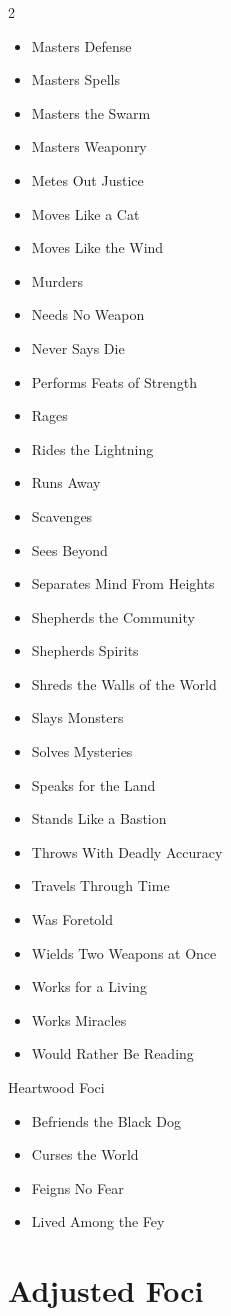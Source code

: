 \begin{multicols}{2}
\begin{itemize}
\item Masters Defense
\item Masters Spells
\item Masters the Swarm
\item Masters Weaponry
\item Metes Out Justice
\item Moves Like a Cat 
\item Moves Like the Wind 
\item Murders
\item Needs No Weapon
\item Never Says Die
\item Performs Feats of Strength
\item Rages
\item Rides the Lightning
\item Runs Away
\item Scavenges
\item Sees Beyond
\item Separates Mind From Heights
\item Shepherds the Community
\item Shepherds Spirits
\item Shreds the Walls of the World
\item Slays Monsters
\item Solves Mysteries
\item Speaks for the Land
\item Stands Like a Bastion
\item Throws With Deadly Accuracy
\item Travels Through Time
\item Was Foretold
\item Wields Two Weapons at Once
\item Works for a Living
\item Works Miracles
\item Would Rather Be Reading
\end{itemize}

Heartwood Foci
\begin{itemize}
\item Befriends the Black Dog 
\item Curses the World
\item Feigns No Fear
\item Lived Among the Fey
\end{itemize}

\section{Adjusted Foci}


\end{multicols}

